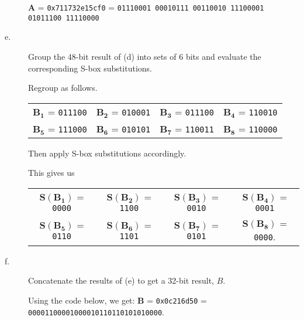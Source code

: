 \documentclass[../hw_sols.tex]{subfiles}
\begin{document}
\begin{description}
\begin{solution}
	$\mathbf{A}$ 
	= \verb|0x711732e15cf0| 
	= \verb|01110001 00010111 00110010 11100001 01011100 11110000|
\end{solution}


\item[e.] Group the 48-bit result of (d) into sets of 6 bits and evaluate the corresponding
S-box substitutions.

\begin{solution}
Regroup as follows.
	\begin{center}
	\begin{tabular}{ c c c c }
		$\mathbf{B_1}$ = \verb|011100| & $\mathbf{B_2}$ = \verb|010001| &
		$\mathbf{B_3}$ = \verb|011100| & $\mathbf{B_4}$ = \verb|110010| \\
		$\mathbf{B_5}$ = \verb|111000| & $\mathbf{B_6}$ = \verb|010101| &
		$\mathbf{B_7}$ = \verb|110011| & $\mathbf{B_8}$ = \verb|110000|
	\end{tabular}
	\end{center}

Then apply S-box substitutions accordingly.



This gives us
	\begin{center}
	\begin{tabular}{ c c c c }
		$\mathbf{S(B_1)}$ = \verb|0000| & $\mathbf{S(B_2)}$ = \verb|1100| &  
		$\mathbf{S(B_3)}$ = \verb|0010| & $\mathbf{S(B_4)}$ = \verb|0001| \\
		$\mathbf{S(B_5)}$ = \verb|0110| & $\mathbf{S(B_6)}$ = \verb|1101| &
		$\mathbf{S(B_7)}$ = \verb|0101| & $\mathbf{S(B_8)}$ = \verb|0000|.
	\end{tabular}
	\end{center}
\end{solution}


\item[f.] Concatenate the results of (e) to get a 32-bit result, $B$.

\begin{solution}
Using the code below, we get: 
$\mathbf{B}$ = \verb|0x0c216d50| = \verb|00001100001000010110110101010000|.




\end{solution}
\end{description}
\end{document}
